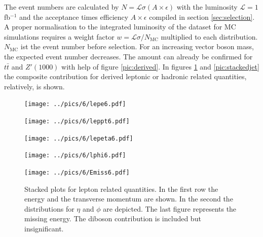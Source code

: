 The event numbers are calculated by $N=\mathcal{L}\sigma (A\times \epsilon)$ with the luminosity $\mathcal{L}=1$ fb$^{-1}$ and the acceptance times
efficiency $A\times\epsilon$ compiled in section \ref{sec:selection}. A proper normalisation to the integrated luminosity of the dataset for MC 
simulations requires a weight factor 
$w=\mathcal{L}\sigma/N_\text{MC}$ multiplied to each distribution. $N_\text{MC}$ ist the event number before selection.
For an increasing vector boson mass, the expected event number decreases. 
The amount can already be confirmed for $t\bar t$ and $Z'(1000)$ with help
of figure \ref{pic:derived}. 
In figures \ref{pic:stackedlep} and \ref{pic:stackedjet} the composite contribution for derived leptonic or hadronic
related quantities, relatively, is shown. 
\begin{figure}
\begin{minipage}{\minwidththree\textwidth}
 \texttt{[image: ../pics/6/lepe6.pdf]}
\end{minipage}
\begin{minipage}{\minwidththree\textwidth}
 \texttt{[image: ../pics/6/leppt6.pdf]}
\end{minipage}


\begin{minipage}{\minwidththree\textwidth}
 \texttt{[image: ../pics/6/lepeta6.pdf]}
\end{minipage}
\begin{minipage}{\minwidththree\textwidth}
 \texttt{[image: ../pics/6/lphi6.pdf]}
\end{minipage}


\begin{minipage}{\minwidththree\textwidth}
 \texttt{[image: ../pics/6/Emiss6.pdf]}
\end{minipage}
\caption{\small{Stacked plots for lepton related quantities. In the first row the energy and the transverse momentum are shown. In the second the distributions
for $\eta$ and $\phi$ are depicted. The last figure represents the missing energy. The diboson contribution is included but insignificant.}}
\label{pic:stackedlep}
 
\end{figure}
